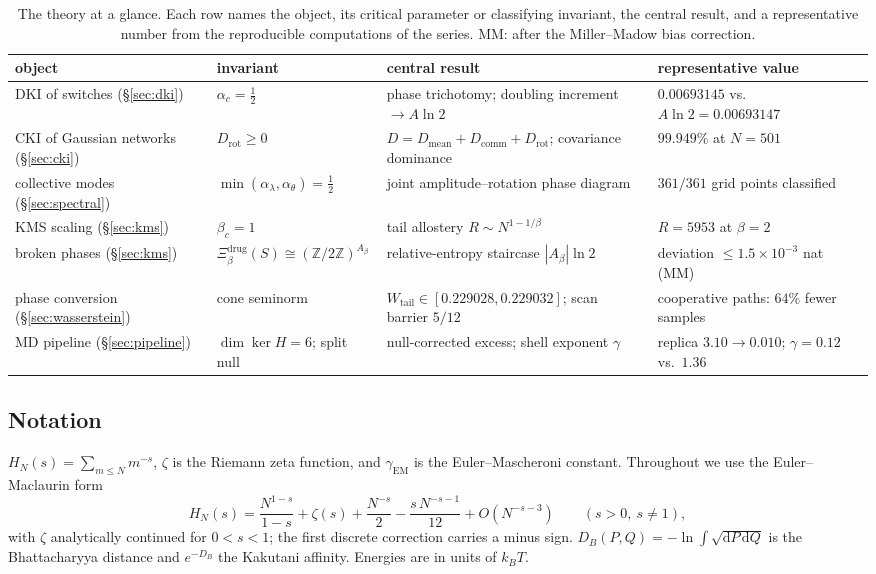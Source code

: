 \documentclass[11pt,reqno]{amsart}
\theoremstyle{plain}
\theoremstyle{definition}
\theoremstyle{remark}
\numberwithin{equation}{section}
\newcommand{\dd}{\mathrm{d}}
\newcommand{\Z}{\mathbb{Z}}
\newcommand{\Xib}{\Xi_\beta^{\mathrm{drug}}(S)}
\newcommand{\Wtail}{W_{\mathrm{tail}}}
\newcommand{\gEM}{\gamma_{\mathrm{EM}}}
\begin{document}
\begin{table}[t]
\centering\footnotesize\setlength{\tabcolsep}{3pt}
\caption{The theory at a glance. Each row names the object, its critical parameter or classifying invariant, the central result, and a representative number from the reproducible computations of the series. MM: after the Miller--Madow bias correction.}
\label{tab:series}
\begin{tabular}{@{}>{\raggedright\arraybackslash}p{}>{\raggedright\arraybackslash}p{}>{\raggedright\arraybackslash}p{}>{\raggedright\arraybackslash}p{}@{}}
\toprule
object & invariant & central result & representative value \\
\midrule
DKI of switches (\S\ref{sec:dki}) & $\alpha_c=\tfrac12$ & phase trichotomy; doubling increment $\to A\ln2$ & $0.00693145$ vs.\ $A\ln2=0.00693147$ \\
CKI of Gaussian networks (\S\ref{sec:cki}) & $D_{\mathrm{rot}}\ge0$ & $D=D_{\mathrm{mean}}+D_{\mathrm{comm}}+D_{\mathrm{rot}}$; covariance dominance & $99.949\%$ at $N=501$ \\
collective modes (\S\ref{sec:spectral}) & $\min(\alpha_\lambda,\alpha_\theta)=\tfrac12$ & joint amplitude--rotation phase diagram & $361/361$ grid points classified \\
KMS scaling (\S\ref{sec:kms}) & $\beta_c=1$ & tail allostery $R\sim N^{1-1/\beta}$ & $R=5953$ at $\beta=2$ \\
broken phases (\S\ref{sec:kms}) & $\Xib\cong(\Z/2\Z)^{A_\beta}$ & relative-entropy staircase $|A_\beta|\ln2$ & deviation $\le1.5\times10^{-3}$ nat (MM) \\
phase conversion (\S\ref{sec:wasserstein}) & cone seminorm & $\Wtail\in[0.229028,0.229032]$; scan barrier $5/12$ & cooperative paths: $64\%$ fewer samples \\
MD pipeline (\S\ref{sec:pipeline}) & $\dim\ker H=6$; split null & null-corrected excess; shell exponent $\gamma$ & replica $3.10\to0.010$; $\gamma=0.12$ vs.\ $1.36$ \\
\bottomrule
\end{tabular}
\end{table}

\subsection*{Notation}
$H_N(s)=\sum_{m\le N}m^{-s}$, $\zeta$ is the Riemann zeta function, and $\gEM$ is the Euler--Mascheroni constant. Throughout we use the Euler--Maclaurin form
\begin{equation}\label{eq:EM}
H_N(s)=\frac{N^{1-s}}{1-s}+\zeta(s)+\frac{N^{-s}}2-\frac{s\,N^{-s-1}}{12}+O(N^{-s-3})\qquad(s>0,\ s\ne1),
\end{equation}
with $\zeta$ analytically continued for $0<s<1$; the first discrete correction carries a minus sign. $D_B(P,Q)=-\ln\int\sqrt{\dd P\,\dd Q}$ is the Bhattacharyya distance and $e^{-D_B}$ the Kakutani affinity. Energies are in units of $k_BT$.
\end{document}
